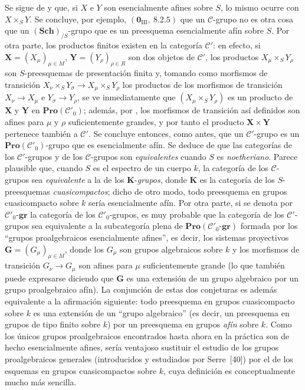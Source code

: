 \begin{remark}[8.13.6]
\label{IV.8.13.6}
Se sigue de  y  que, si $X$ e $Y$ son esencialmente afines sobre $S$, lo mismo ocurre con $X\times_S Y$.
Se concluye, por ejemplo, $(\mathbf{0}_{\text{III}},~8.2.5)$ que un $\mathcal{C}$-grupo no es otra cosa que un $(\mathbf{Sch})_{/S}$-grupo que es un preesquema esencialmente afín sobre $S$.
Por otra parte, los productos finitos existen en la categoría $\mathcal{C}'$: en efecto, si $\mathbf{X}=(X_\mu)_{\mu\in M}$, $\mathbf{Y}=(Y_\rho)_{\rho\in R}$ son dos objetos de $\mathcal{C}'$, los productos $X_\mu\times_S Y_\rho$ son $S$-preesquemas de presentación finita y, tomando como morfismos de transición $X_\nu\times_S Y_\sigma\to X_\mu\times_S Y_\rho$ los productos de los morfismos de transición $X_\nu\to X_\mu$ e $Y_\sigma\to Y_\rho$, se ve inmediatamente que $(X_\mu\times_S Y_\rho)$ es un producto de $\mathbf{X}$ y $\mathbf{Y}$ en $\mathbf{Pro}(\mathcal{C}'_0)$; además, por , los morfismos de transición así definidos son afines para $\mu$ y $\rho$ suficientemente grandes, y por tanto el producto $\mathbf{X}\times\mathbf{Y}$ pertenece también a $\mathcal{C}'$.
Se concluye entonces, como antes, que un $\mathcal{C}'$-grupo es un $\mathbf{Pro}(\mathcal{C}'_0)$-grupo que es esencialmente afín.
Se deduce de  que las categorías de los $\mathcal{C}'$-grupos y de los $\mathcal{C}$-grupos son \emph{equivalentes} cuando $S$ es \emph{noetheriano}.
Parece plausible que, cuando $S$ es el espectro de un cuerpo $k$, la categoría de los $\mathcal{C}$-grupos sea \emph{equivalente} a la de los $\boldsymbol{K}$-\emph{grupos}, donde $\boldsymbol{K}$ es la categoría de los $S$-preesquemas \emph{cuasicompactos}; dicho de otro modo, todo preesquema en grupos cuasicompacto sobre $k$ sería esencialmente afín.
Por otra parte, si se denota
por $\mathcal{C}'_0$-$\boldsymbol{gr}$ la categoría de los $\mathcal{C}'_0$-grupos, es muy probable que la categoría de los $\mathcal{C}'$-grupos sea equivalente a la subcategoría plena de $\mathbf{Pro}(\mathcal{C}'_0\text{-}\boldsymbol{gr})$ formada por los ``grupos proalgebraicos esencialmente afines'', es decir, los sistemas proyectivos $\mathbf{G}=(G_\mu)_{\mu\in M}$, donde los $G_\mu$ son grupos algebraicos sobre $k$ y los morfismos de transición $G_\nu\to G_\mu$ son afines para $\mu$ suficientemente grande (lo que también puede expresarse diciendo que $\mathbf{G}$ es una extensión de un grupo algebraico por un grupo proalgebraico afín).
La conjunción de estas dos conjeturas es además equivalente a la afirmación siguiente: todo preesquema en grupos cuasicompacto sobre $k$ es una extensión de un ``grupo algebraico'' (es decir, un preesquema en grupos de tipo finito sobre $k$) por un preesquema en grupos \emph{afín} sobre $k$.
Como los únicos grupos proalgebraicos encontrados hasta ahora en la práctica son de hecho esencialmente afines, sería ventajoso sustituir el estudio de los grupos proalgebraicos generales (introducidos y estudiados por Serre~[40]) por el de los esquemas en grupos cuasicompactos sobre $k$, cuya definición es conceptualmente mucho más sencilla.
\end{remark}

